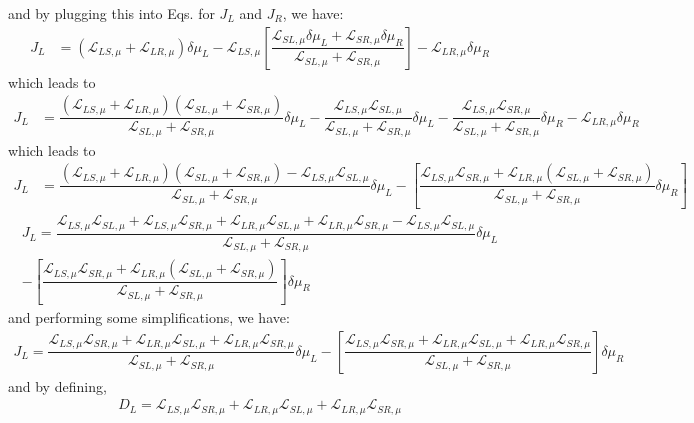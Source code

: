 \begin{widetext}
and by plugging this into Eqs. for $J_{L}$ and $J_{R}$, we have:
\begin{align*}
J_{L}&=
(\mathcal{L}_{LS,\mu}+\mathcal{L}_{LR,\mu})\delta\mu_{L}
-\mathcal{L}_{LS,\mu}\left[\dfrac{\mathcal{L}_{SL,\mu}\delta\mu_{L}+\mathcal{L}_{SR,\mu}\delta\mu_{R}}{\mathcal{L}_{SL,\mu}+\mathcal{L}_{SR,\mu}}\right]
-\mathcal{L}_{LR,\mu}\delta\mu_{R}
\end{align*}
which leads to
\begin{align*}
J_{L}&=
\dfrac{(\mathcal{L}_{LS,\mu}+\mathcal{L}_{LR,\mu})(\mathcal{L}_{SL,\mu}+\mathcal{L}_{SR,\mu})}{\mathcal{L}_{SL,\mu}+\mathcal{L}_{SR,\mu}}\delta\mu_{L}
-
\dfrac{\mathcal{L}_{LS,\mu}\mathcal{L}_{SL,\mu}}{\mathcal{L}_{SL,\mu}+\mathcal{L}_{SR,\mu}}\delta\mu_{L}
-
\dfrac{\mathcal{L}_{LS,\mu}\mathcal{L}_{SR,\mu}}{\mathcal{L}_{SL,\mu}+\mathcal{L}_{SR,\mu}}\delta\mu_{R}
-
\mathcal{L}_{LR,\mu}\delta\mu_{R}
\end{align*}
which leads to
\begin{align*}
J_{L}&=
\dfrac{(\mathcal{L}_{LS,\mu}+\mathcal{L}_{LR,\mu})(\mathcal{L}_{SL,\mu}+\mathcal{L}_{SR,\mu})-\mathcal{L}_{LS,\mu}\mathcal{L}_{SL,\mu}}{\mathcal{L}_{SL,\mu}+\mathcal{L}_{SR,\mu}}\delta\mu_{L}
-\left[
\dfrac{\mathcal{L}_{LS,\mu}\mathcal{L}_{SR,\mu}+\mathcal{L}_{LR,\mu}(\mathcal{L}_{SL,\mu}+\mathcal{L}_{SR,\mu})}{\mathcal{L}_{SL,\mu}+\mathcal{L}_{SR,\mu}}\delta\mu_{R}
\right]
\end{align*}
\begin{multline*}
J_{L}=
\dfrac{\mathcal{L}_{LS,\mu}\mathcal{L}_{SL,\mu}
+
\mathcal{L}_{LS,\mu}\mathcal{L}_{SR,\mu}
+
\mathcal{L}_{LR,\mu}\mathcal{L}_{SL,\mu}
+
\mathcal{L}_{LR,\mu}\mathcal{L}_{SR,\mu}-\mathcal{L}_{LS,\mu}\mathcal{L}_{SL,\mu}}{\mathcal{L}_{SL,\mu}+\mathcal{L}_{SR,\mu}}\delta\mu_{L}
\\-\left[
\dfrac{\mathcal{L}_{LS,\mu}\mathcal{L}_{SR,\mu}+\mathcal{L}_{LR,\mu}(\mathcal{L}_{SL,\mu}+\mathcal{L}_{SR,\mu})}{\mathcal{L}_{SL,\mu}+\mathcal{L}_{SR,\mu}}
\right]\delta\mu_{R}
\end{multline*}
and performing some simplifications, we have:
\begin{align*}
J_{L}=
\dfrac{
\mathcal{L}_{LS,\mu}\mathcal{L}_{SR,\mu}
+
\mathcal{L}_{LR,\mu}\mathcal{L}_{SL,\mu}
+
\mathcal{L}_{LR,\mu}\mathcal{L}_{SR,\mu}}{\mathcal{L}_{SL,\mu}+\mathcal{L}_{SR,\mu}}\delta\mu_{L}
-\left[
\dfrac{\mathcal{L}_{LS,\mu}\mathcal{L}_{SR,\mu}+\mathcal{L}_{LR,\mu}\mathcal{L}_{SL,\mu}+\mathcal{L}_{LR,\mu}\mathcal{L}_{SR,\mu}}{\mathcal{L}_{SL,\mu}+\mathcal{L}_{SR,\mu}}
\right]\delta\mu_{R}
\end{align*} 
and by defining, 
\begin{align*}
D_{L}=\mathcal{L}_{LS,\mu}\mathcal{L}_{SR,\mu}+\mathcal{L}_{LR,\mu}\mathcal{L}_{SL,\mu}+\mathcal{L}_{LR,\mu}\mathcal{L}_{SR,\mu}
\end{align*}
\end{widetext}
